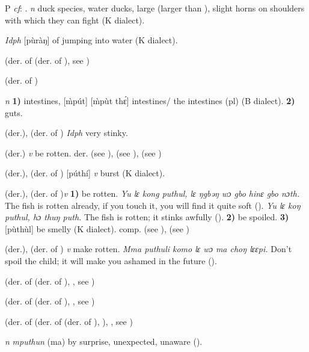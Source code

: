 \begin{letter}{P}
 \textit{cf}: . \textit{n} duck species, water ducks, large (larger than ), slight horns on shoulders with which they can fight (K dialect). 

 \textit{Idph} [pùràŋ] of jumping into water (K dialect). 

 (der. of  (der. of ), see ) 

 (der. of )

 \textit{n} \textbf{1)} intestines, [\`{m}pút] [\`{m}pùt thɛ́] intestines/ the intestines (pl) (B dialect). \textbf{2)} guts.

 (der.), (der. of ) \textit{Idph} very stinky.

 (der.) \textit{v} be rotten. der.  (see ),  (see ),  (see )

 (der.), (der. of ) [púthí] \textit{v} burst (K dialect).

 (der.), (der. of )\textit{v} \textbf{1)} be rotten. \textit{Yu lɛ kong puthul, lɛ ŋgbəŋ wɔ gbo hinɛ gbo nɔth.} The fish is rotten already, if you touch it, you will find it quite soft (\citealt{Pichl1967}). \textit{Yu lɛ koŋ puthul, hɔ thuŋ puth.} The fish is rotten; it stinks awfully (\citealt{Pichl1967}). \textbf{2)} be spoiled. \textbf{3)} [pùthùl] be smelly (K dialect). comp.  (see ),  (see ) 

 (der.), (der. of ) \textit{v} make rotten. \textit{Mma puthuli komo lɛ wɔ ma choŋ lɛɛpi.} Don't spoil the child; it will make you ashamed in the future (\citealt{Pichl1967}). 

 (der. of  (der. of ), , see ) 

 (der. of  (der. of ), , see )

 (der. of  (der. of  (der. of ), ), , see )

 \textit{n} \textit{mputhun} (ma) by surprise, unexpected, unaware (\citealt{Pichl1967}).


\end{letter}
